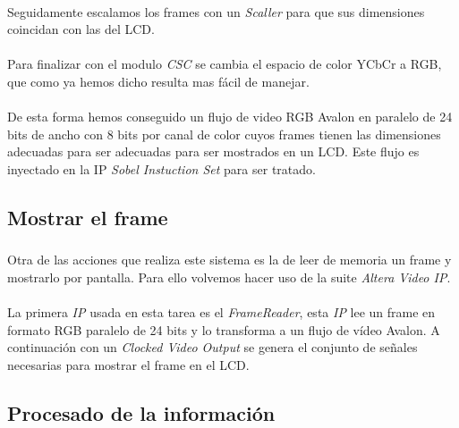 \documentclass[a4paper,12pt,titlepage,final]{book}
\begin{document}
\paragraph{}
Seguidamente escalamos los frames con un \textit{Scaller} para que sus dimensiones coincidan con las del LCD.

\paragraph{}
Para finalizar con el modulo \textit{CSC} se cambia el espacio de color YCbCr a RGB, que como ya hemos dicho resulta mas fácil de manejar.

\paragraph{}
De esta forma hemos conseguido un flujo de video RGB Avalon en paralelo de 24 bits de ancho con 8 bits por canal de color cuyos frames tienen las dimensiones adecuadas para ser adecuadas para ser mostrados en un LCD. Este flujo es inyectado en la IP \textit{Sobel Instuction Set} para ser tratado.

\subsection{Mostrar el frame}
\subsubsection*{}

\paragraph{}
Otra de las acciones que realiza este sistema es la de leer de memoria un frame y mostrarlo por pantalla. Para ello volvemos hacer uso de la suite \textit{Altera Video IP}.

\paragraph{}
La primera \textit{IP} usada en esta tarea es el \textit{FrameReader}, esta \textit{IP} lee un frame en formato RGB paralelo de 24 bits y lo transforma a un flujo de vídeo Avalon. A continuación con un \textit{Clocked Video Output} se genera el conjunto de señales necesarias para mostrar el frame en el LCD.

\subsection{Procesado de la información}
\end{document}
